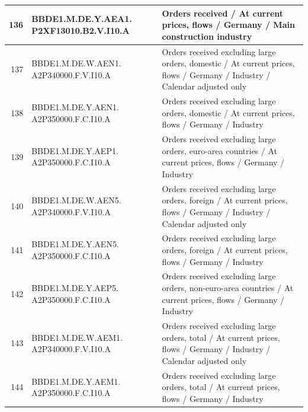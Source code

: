 \documentclass[12pt]{article}
\begin{document}
\begin{table}
\begin{tabular}{rp{5cm}p{11cm}}
  \hline
  136 & BBDE1.M.DE.Y.AEA1. P2XF13010.B2.V.I10.A & Orders received / At current prices, flows / Germany / Main construction industry \\ 
  \hline
  137 & BBDE1.M.DE.W.AEN1. A2P340000.F.V.I10.A & Orders received excluding large orders, domestic / At current prices, flows / Germany / Industry / Calendar adjusted only \\ 
  \hline
  138 & BBDE1.M.DE.Y.AEN1. A2P350000.F.C.I10.A & Orders received excluding large orders, domestic / At current prices, flows / Germany / Industry  \\ 
  \hline
  139 & BBDE1.M.DE.Y.AEP1. A2P350000.F.C.I10.A & Orders received excluding large orders, euro-area countries / At current prices, flows / Germany / Industry \\ 
  \hline
  140 & BBDE1.M.DE.W.AEN5. A2P340000.F.V.I10.A & Orders received excluding large orders, foreign / At current prices, flows / Germany / Industry / Calendar adjusted only \\ 
  \hline
  141 & BBDE1.M.DE.Y.AEN5. A2P350000.F.C.I10.A & Orders received excluding large orders, foreign / At current prices, flows / Germany / Industry \\ 
  \hline
  142 & BBDE1.M.DE.Y.AEP5. A2P350000.F.C.I10.A & Orders received excluding large orders, non-euro-area countries / At current prices, flows / Germany / Industry \\ 
  \hline
  143 & BBDE1.M.DE.W.AEM1. A2P340000.F.V.I10.A & Orders received excluding large orders, total / At current prices, flows / Germany / Industry / Calendar adjusted only \\ 
  \hline
  144 & BBDE1.M.DE.Y.AEM1. A2P350000.F.C.I10.A & Orders received excluding large orders, total / At current prices, flows / Germany / Industry \\ 

\end{tabular}
\end{table}
\end{document}
